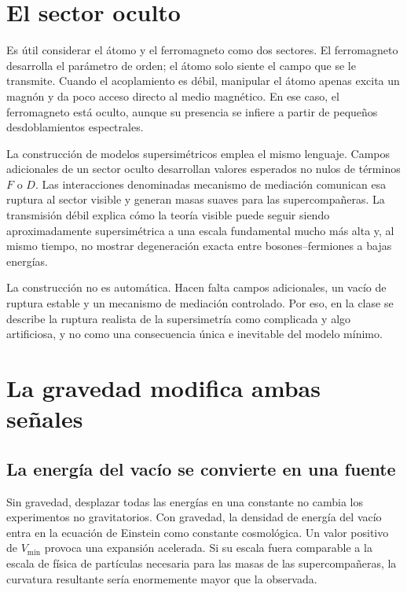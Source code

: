 \section{El sector oculto}

Es útil considerar el átomo y el ferromagneto como dos sectores. El ferromagneto desarrolla el parámetro de orden; el átomo solo siente el campo que se le transmite. Cuando el acoplamiento es débil, manipular el átomo apenas excita un magnón y da poco acceso directo al medio magnético. En ese caso, el ferromagneto está oculto, aunque su presencia se infiere a partir de pequeños desdoblamientos espectrales.

La construcción de modelos supersimétricos emplea el mismo lenguaje. Campos adicionales de un sector oculto desarrollan valores esperados no nulos de términos \(F\) o \(D\). Las interacciones denominadas mecanismo de mediación comunican esa ruptura al sector visible y generan masas suaves para las supercompañeras. La transmisión débil explica cómo la teoría visible puede seguir siendo aproximadamente supersimétrica a una escala fundamental mucho más alta y, al mismo tiempo, no mostrar degeneración exacta entre bosones--fermiones a bajas energías.

La construcción no es automática. Hacen falta campos adicionales, un vacío de ruptura estable y un mecanismo de mediación controlado. Por eso, en la clase se describe la ruptura realista de la supersimetría como complicada y algo artificiosa, y no como una consecuencia única e inevitable del modelo mínimo.

\section{La gravedad modifica ambas señales}

\subsection{La energía del vacío se convierte en una fuente}

Sin gravedad, desplazar todas las energías en una constante no cambia los experimentos no gravitatorios. Con gravedad, la densidad de energía del vacío entra en la ecuación de Einstein como constante cosmológica. Un valor positivo de \(V_{\min}\) provoca una expansión acelerada. Si su escala fuera comparable a la escala de física de partículas necesaria para las masas de las supercompañeras, la curvatura resultante sería enormemente mayor que la observada.

